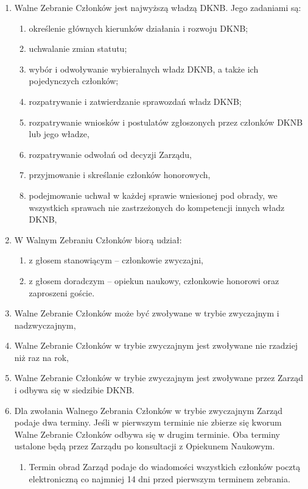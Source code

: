 \documentclass{article}
\begin{document}
  \begin{enumerate}
    \item Walne Zebranie Członków jest najwyższą władzą DKNB. Jego zadaniami są:
      \begin{enumerate}
        \item określenie głównych kierunków działania i rozwoju DKNB;
        \item uchwalanie zmian statutu;
        \item wybór i odwoływanie wybieralnych władz DKNB, a także ich pojedynczych członków;
        \item rozpatrywanie i zatwierdzanie sprawozdań władz DKNB;
        \item rozpatrywanie wniosków i postulatów zgłoszonych przez członków DKNB lub jego władze,
        \item rozpatrywanie odwołań od decyzji Zarządu,
        \item przyjmowanie i skreślanie członków honorowych,
        \item podejmowanie uchwał w każdej sprawie wniesionej pod obrady, we wszystkich sprawach nie zastrzeżonych do kompetencji innych władz DKNB,
      \end{enumerate}
        \item W Walnym Zebraniu Członków biorą udział:
          \begin{enumerate}
            \item z głosem stanowiącym – członkowie zwyczajni,
            \item z głosem doradczym – opiekun naukowy, członkowie honorowi oraz zaproszeni goście.
          \end{enumerate}
        \item Walne Zebranie Członków może być zwoływane w trybie zwyczajnym i nadzwyczajnym,
        \item Walne Zebranie Członków w trybie zwyczajnym jest zwoływane nie rzadziej niż raz na rok,
        \item Walne Zebranie Członków w trybie zwyczajnym jest zwoływane przez Zarząd i odbywa się w siedzibie DKNB.
    \item Dla zwołania Walnego Zebrania Członków w trybie zwyczajnym Zarząd podaje dwa terminy. Jeśli w pierwszym terminie nie zbierze się kworum Walne Zebranie Członków odbywa się w drugim terminie. Oba terminy ustalone będą przez Zarządu po konsultacji z Opiekunem Naukowym.
      \begin{enumerate}
        \item Termin obrad Zarząd podaje do wiadomości wszystkich członków pocztą elektroniczną co najmniej 14 dni przed pierwszym terminem zebrania.

\end{enumerate}
\end{enumerate}
\end{document}
